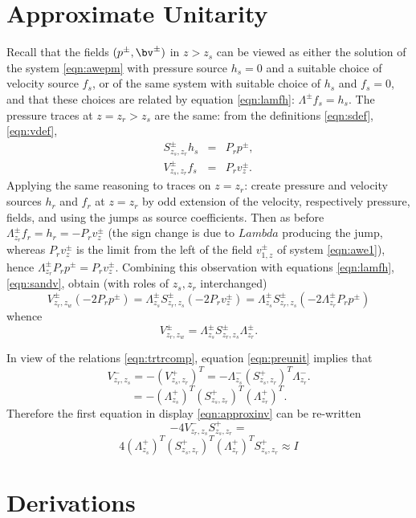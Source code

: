 \section{Approximate Unitarity}
Recall that the fields $(p^{\pm},\bv^{\pm})$ in $z>z_s$ can be viewed
as either the solution of the system \ref{eqn:awepm} with pressure source $h_s=0$ and
a suitable choice of velocity source $f_s$, or of the same system with
suitable choice of $h_s$ and $f_s=0$, and that these choices are
related by equation \ref{eqn:lamfh}: $\Lambda^{\pm}f_s = h_s$. The
pressure traces at $z=z_r>z_s$ are the same: from the definitions
\ref{eqn:sdef}, \ref{eqn:vdef},
\begin{eqnarray}
  \label{eqn:sandv}
  S^{\pm}_{z_s,z_r}h_s& =& P_rp^{\pm},\nonumber \\
  V^{\pm}_{z_s,z_r}f_s &=& P_rv_z^{\pm}.
\end{eqnarray}
Applying the same reasoning to traces on $z=z_r$: create pressure and
velocity sources $h_r$ and $f_r$ at $z=z_r$ by odd extension of the
velocity, respectively pressure, fields, and using the jumps as source
coefficients. Then as before
$\Lambda^{\pm}_{z_r}f_r=h_r=-P_rv^{\pm}_z$ (the sign change is due to
$Lambda$ producing the jump, whereas $P_rv^{\pm}_z$ is the limit from
the left of the field $v^{\pm}_{1,z}$ of system \ref{eqn:awe1}), hence
$\Lambda^{\pm}_{z_r}P_rp^{\pm} = P_rv_z^{\pm}$. Combining this
observation with equations
\ref{eqn:lamfh}, \ref{eqn:sandv}, obtain (with roles of $z_s,z_r$ interchanged)
\[
V^{\pm}_{z_r,z_w}(-2P_rp^{\pm}) =
  \Lambda^{\pm}_{z_s}S^{\pm}_{z_r,z_s}(-2P_rv_z^{\pm})  =
  \Lambda^{\pm}_{z_s}S^{\pm}_{z_r,z_s}(-2\Lambda^{\pm}_{z_r}P_rp^{\pm})
\]
whence
\begin{equation}
  \label{eqn:preunit}
 V^{\pm}_{z_r,z_w}
 =\Lambda^{\pm}_{z_s}S^{\pm}_{z_r,z_s}\Lambda^{\pm}_{z_r}.
\end{equation}

In view of the relations \ref{eqn:trtrcomp}, equation
\ref{eqn:preunit} implies that
\[
  V^-_{z_r,z_s}=-(V^+_{z_s,z_r})^T = -\Lambda^{-}_{z_s}(S^+_{z_s,z_r})^T\Lambda^{-}_{z_r}.
\]
\[
  =-(\Lambda^{+}_{z_s})^T(S^+_{z_s,z_r})^T(\Lambda^{+}_{z_r})^T.
\]
Therefore the first equation in display \ref{eqn:approxinv} can be re-written
\[
  -4V^-_{z_r,z_s}S^+_{z_s,z_r} =
\]
\begin{equation}
  \label{eqn:baseunit}
 4 (\Lambda^{+}_{z_s})^T(S^+_{z_s,z_r})^T(\Lambda^{+}_{z_r})^T
  S^+_{z_s,z_r} \approx I
\end{equation}

\section{Derivations}
